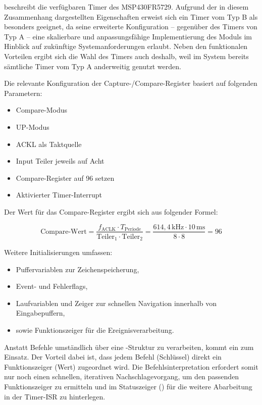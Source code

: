  beschreibt die verf\"ugbaren Timer des MSP430FR5729. Aufgrund der in diesem Zusammenhang dargestellten Eigenschaften erweist sich ein Timer vom Typ B als besonders geeignet, da seine erweiterte Konfiguration -- gegen\"uber des Timers von Typ A -- eine skalierbare und anpassungsf\"ahige Implementierung des Moduls im Hinblick auf zuk\"unftige Systemanforderungen erlaubt. Neben den funktionalen Vorteilen ergibt sich die Wahl des Timers auch deshalb, weil im System bereits s\"amtliche Timer vom Typ A anderweitig genutzt werden.

\newpage
Die relevante Konfiguration der Capture-/Compare-Register basiert auf folgenden Parametern:

\begin{multicols}{2}
	\begin{itemize}
		\item Compare-Modus
		\item UP-Modus
		\item ACKL als Taktquelle
	\end{itemize}	
\vfill\null
\columnbreak
	\begin{itemize}	
		\item Input Teiler jeweils auf Acht
		\item Compare-Register auf 96 setzen
		\item Aktivierter Timer-Interrupt
	\end{itemize}
\vfill\null	
\end{multicols}

Der Wert f\"ur das Compare-Register ergibt sich aus folgender Formel:

\[
\text{Compare-Wert} = \frac{f_\text{ACLK} \cdot T_\text{Periode}}{\text{Teiler}_1 \cdot \text{Teiler}_2} = \frac{614{,}4\,\text{kHz} \cdot 10\,\text{ms}}{8 \cdot 8} = 96
\]

Weitere Initialisierungen umfassen:
\begin{itemize}
	\item Puffervariablen zur Zeichenspeicherung,
	\item Event- und Fehlerflags,
	\item Laufvariablen und Zeiger zur schnellen Navigation innerhalb von Eingabepuffern,
	\item sowie Funktionszeiger f\"ur die Ereignisverarbeitung.
\end{itemize}

\vspace{0.5cm}
Anstatt Befehle umst\"andlich \"uber eine -Struktur zu verarbeiten, kommt ein  zum Einsatz. Der Vorteil dabei ist, dass jedem Befehl (Schl\"ussel) direkt ein Funktionszeiger (Wert) zugeordnet wird. Die Befehlsinterpretation erfordert somit nur noch einen schnellen, iterativen Nachschlagevorgang, um den passenden Funktionszeiger zu ermitteln und im Statuszeiger () f\"ur die weitere Abarbeitung in der Timer-ISR zu hinterlegen.

